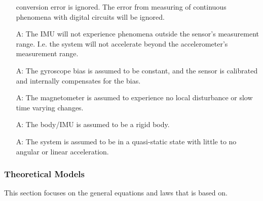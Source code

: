 \documentclass[12pt]{article}
\begin{document}
\begin{itemize}
    conversion error is ignored. The error from measuring of continuous phenomena with digital
    circuits will be ignored.
    \item[A\refstepcounter{assumpnum}\theassumpnum \label{a:range}:] The IMU will not experience
    phenomena outside the sensor's measurement range. I.e. the system will not accelerate beyond the
    accelerometer's measurement range.
    \item[A\refstepcounter{assumpnum}\theassumpnum \label{a:gyro}:] The gyroscope bias is assumed to
    be constant, and the sensor is calibrated and internally compensates for the bias.
    \item[A\refstepcounter{assumpnum}\theassumpnum \label{a:mag}:] The magnetometer is assumed to
    experience no local disturbance or slow time varying changes.
    \item[A\refstepcounter{assumpnum}\theassumpnum \label{a:rigid}:] The body/IMU is assumed to be a
    rigid body.
    \item[A\refstepcounter{assumpnum}\theassumpnum \label{a:static}:] The system is assumed to be in
    a quasi-static state with little to no angular or linear acceleration.
\end{itemize}

\subsubsection{Theoretical Models}\label{sec_theoretical}



This section focuses on the general equations and laws that \progname{} is based on.  

\end{document}

